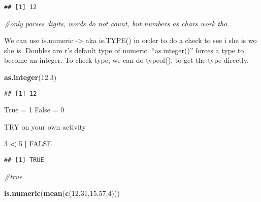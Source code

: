 \documentclass[
]{article}
\newenvironment{Shaded}{\begin{snugshade}}{\end{snugshade}}
\newcommand{\CommentTok}[1]{\textcolor[rgb]{0.56,0.35,0.01}{\textit{#1}}}
\newcommand{\ConstantTok}[1]{\textcolor[rgb]{0.56,0.35,0.01}{#1}}
\newcommand{\DecValTok}[1]{\textcolor[rgb]{0.00,0.00,0.81}{#1}}
\newcommand{\FloatTok}[1]{\textcolor[rgb]{0.00,0.00,0.81}{#1}}
\newcommand{\FunctionTok}[1]{\textcolor[rgb]{0.13,0.29,0.53}{\textbf{#1}}}
\newcommand{\NormalTok}[1]{#1}
\newcommand{\SpecialCharTok}[1]{\textcolor[rgb]{0.81,0.36,0.00}{\textbf{#1}}}
\begin{document}
\begin{verbatim}
## [1] 12
\end{verbatim}

\begin{Shaded}
\begin{Highlighting}[]
\CommentTok{\#only parses digits, words do not count, but numbers as chars work tho.}
\end{Highlighting}
\end{Shaded}

We can use is.numeric -\textgreater{} aka is.TYPE() in order to do a
check to see i she is wo she is. Doubles are r's default type of
numeric. ``as.integer()'' forces a type to become an integer. To check
type, we can do typeof(), to get the type directly.

\begin{Shaded}
\begin{Highlighting}[]
\FunctionTok{as.integer}\NormalTok{(}\FloatTok{12.3}\NormalTok{)}
\end{Highlighting}
\end{Shaded}

\begin{verbatim}
## [1] 12
\end{verbatim}

True = 1 False = 0

TRY on your own activity

\begin{Shaded}
\begin{Highlighting}[]
\DecValTok{3} \SpecialCharTok{\textless{}} \DecValTok{5} \SpecialCharTok{|} \ConstantTok{FALSE}
\end{Highlighting}
\end{Shaded}

\begin{verbatim}
## [1] TRUE
\end{verbatim}

\begin{Shaded}
\begin{Highlighting}[]
\CommentTok{\#true}
\end{Highlighting}
\end{Shaded}

\begin{Shaded}
\begin{Highlighting}[]
\FunctionTok{is.numeric}\NormalTok{(}\FunctionTok{mean}\NormalTok{(}\FunctionTok{c}\NormalTok{(}\DecValTok{12}\NormalTok{,}\DecValTok{31}\NormalTok{,}\FloatTok{15.57}\NormalTok{,}\DecValTok{4}\NormalTok{)))}
\end{Highlighting}
\end{Shaded}
\end{document}

